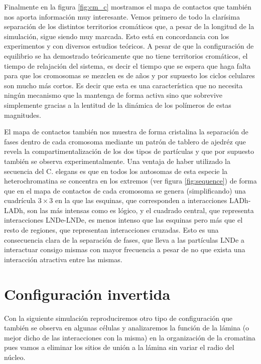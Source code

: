 Finalmente en la figura \ref{fig:cm_c} mostramos el mapa de contactos que también nos aporta información muy interesante. Vemos primero de todo la clarísima separación de los distintos territorios cromáticos que, a pesar de la longitud de la simulación, sigue siendo muy marcada. Esto está en concordancia con los experimentos y con diversos estudios teóricos. A pesar de que la configuración de equilibrio se ha demostrado teóricamente que no tiene territorios cromáticos, el tiempo de relajación del sistema, es decir el tiempo que se espera que haga falta para que los cromosomas se mezclen es de años \cite{Rosa2008} y por supuesto los ciclos celulares son mucho más cortos. Es decir que esta es una característica que no necesita ningún mecanismo que la mantenga de forma activa sino que sobrevive simplemente gracias a la lentitud de la dinámica de los polímeros de estas magnitudes.

El mapa de contactos también nos muestra de forma cristalina la separación de fases dentro de cada cromosoma mediante un patrón de tablero de ajedréz que revela la compartimentalización de los dos tipos de partículas y que por supuesto también se observa experimentalmente. Una ventaja de haber utilizado la secuencia del C. elegans es que en todos los autosomas de esta especie la heterochromatina se concentra en los extremos (ver figura \ref{fig:sequence}) de forma que en el mapa de contactos de cada cromosoma se genera (simplificando) una cuadrícula $3\times3$ en la que las esquinas, que corresponden a interacciones LADh-LADh, son las más intensas como es lógico, y el cuadrado central, que representa interacciones LNDe-LNDe, es menos intenso que las esquinas pero más que el resto de regiones, que representan interacciones cruzadas. Esto es una consecuencia clara de la separación de fases, que lleva a las partículas LNDe a interactuar consigo mismas con mayor frecuencia a pesar de no que exista una interacción atractiva entre las mismas.

\section{Configuración invertida}

Con la siguiente simulación reproduciremos otro tipo de configuración que también se observa en algunas células \cite{Camara2023} y analizaremos la función de la lámina (o mejor dicho de las interacciones con la misma) en la organización de la cromatina pues vamos a eliminar los sitios de unión a la lámina sin variar el radio del núcleo.

